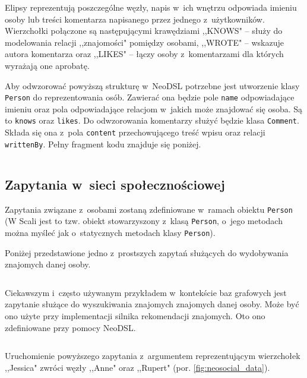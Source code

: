 \documentclass[brudnopis]{xmgr}
\begin{document}
Elipsy reprezentują poszczególne węzły, napis w~ich wnętrzu odpowiada imieniu osoby lub treści komentarza napisanego przez jednego z~użytkowników. Wierzchołki połączone są następującymi krawędziami  ,,KNOWS" -- służy do modelowania relacji ,,znajomości" pomiędzy osobami, ,,WROTE" -- wskazuje autora komentarza oraz ,,LIKES" -- łączy osoby z~komentarzami dla których wyrażają one aprobatę.

Aby odwzorować powyższą strukturę w~NeoDSL potrzebne jest utworzenie klasy \texttt{Person} do reprezentowania osób. Zawierać ona będzie pole \texttt{name} odpowiadające imieniu oraz pola odpowiadające relacjom w~jakich może znajdować się osoba. Są to \texttt{knows} oraz \texttt{likes}. Do odwzorowania komentarzy służyć będzie klasa \texttt{Comment}. Składa się ona z~pola \texttt{content} przechowującego treść wpisu oraz relacji \texttt{writtenBy}. Pełny fragment kodu znajduje się poniżej.

\inputminted{scala}{listings/scala/examples/socialnetwork/domain-classes.scala}

\subsection{Zapytania w~sieci społecznościowej}

Zapytania związane z~osobami zostaną zdefiniowane w~ramach obiektu \texttt{Person} (W Scali jest to tzw. obiekt stowarzyszony z~klasą \texttt{Person}, o~jego metodach można myśleć jak o~statycznych metodach klasy \texttt{Person}).

Poniżej przedstawione jedno z~prostszych zapytań służących do wydobywania znajomych danej osoby.

\inputminted{scala}{listings/scala/examples/socialnetwork/person-friends-query.scala}

Ciekawszym i~często używanym przykładem w~kontekście baz grafowych jest zapytanie służące do wyszukiwania znajomych znajomych danej osoby. Może być ono użyte przy implementacji silnika rekomendacji znajomych. Oto ono zdefiniowane przy pomocy NeoDSL.

\inputminted{scala}{listings/scala/examples/socialnetwork/person-fof-query.scala}

Uruchomienie powyższego zapytania z~argumentem reprezentującym wierzchołek ,,Jessica" zwróci węzły ,,Anne" oraz ,,Rupert" (por. \ref{fig:neosocial_data}).

\inputminted{scala}{listings/scala/examples/socialnetwork/person-fof-result.scala}
\inputminted{text}{listings/text/person-fof-result.txt}
\end{document}
